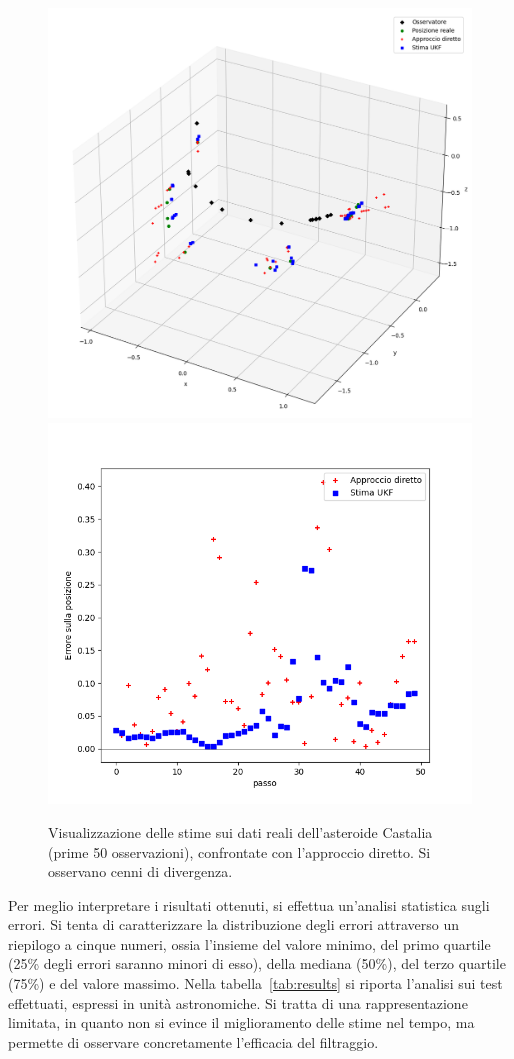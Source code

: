 \documentclass[12pt,a4paper,openright,twoside]{book}
\begin{document}
\begin{figure}
	\includegraphics[width=0.55\linewidth]{figures/Castalia_50_3d.png}
    \includegraphics[width=0.45\linewidth]{figures/Castalia_50_error.png}
    \caption{Visualizzazione delle stime sui dati reali dell'asteroide Castalia (prime 50 osservazioni), confrontate con l'approccio diretto. Si osservano cenni di divergenza.}
    \label{fig:Castalia50}
\end{figure}

\pagebreak

Per meglio interpretare i risultati ottenuti, si effettua un'analisi statistica sugli errori. Si tenta di caratterizzare la distribuzione degli errori attraverso un riepilogo a cinque numeri, ossia l'insieme del valore minimo, del primo quartile (25\% degli errori saranno minori di esso), della mediana (50\%), del terzo quartile (75\%) e del valore massimo. Nella tabella~\ref{tab:results} si riporta l'analisi sui test effettuati, espressi in unità astronomiche. Si tratta di una rappresentazione limitata, in quanto non si evince il miglioramento delle stime nel tempo, ma permette di osservare concretamente l'efficacia del filtraggio.
\end{document}
